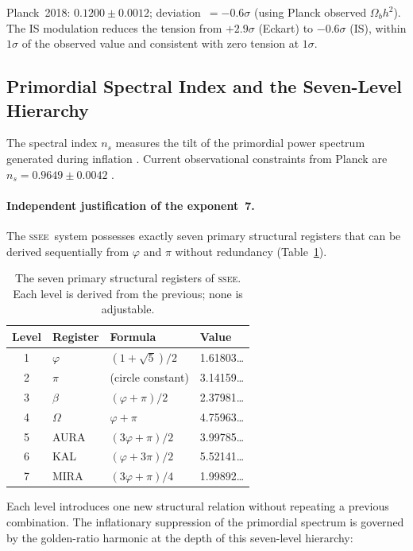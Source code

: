 \documentclass[12pt,a4paper]{article}
\newcommand{\SSEE}{\ifmmode\mathrm{SSEE}\else\textsc{ssee}\fi}
\begin{document}
Planck~2018: $0.1200\pm0.0012$; deviation~$= -0.6\sigma$ (using Planck observed $\Omega_b h^2$).
The IS modulation reduces the tension from $+2.9\sigma$ (Eckart) to $-0.6\sigma$ (IS),
within $1\sigma$ of the observed value and consistent with zero tension at $1\sigma$.

\subsection{Primordial Spectral Index and the Seven-Level Hierarchy}
\label{sec:ns}

The spectral index $n_s$ measures the tilt of the primordial power spectrum
generated during inflation \citep{Mukhanov1992,Starobinsky1980,Albrecht1982,Guth1981,Linde1982}.
Current observational constraints from Planck are $n_s = 0.9649 \pm 0.0042$
\citep{PlanckInflation2018}.

\paragraph{Independent justification of the exponent~7.}
The \SSEE\ system possesses exactly seven primary structural registers that
can be derived sequentially from $\varphi$ and $\pi$ without redundancy
(Table~\ref{tab:hierarchy}).

\begin{table}[ht]
\centering
\caption{The seven primary structural registers of \SSEE.
Each level is derived from the previous; none is adjustable.}
\label{tab:hierarchy}
\begin{tabular}{clll}
\toprule
Level & Register & Formula & Value \\
\midrule
1 & $\varphi$ & $(1+\sqrt5)/2$ & 1.61803\ldots \\
2 & $\pi$     & (circle constant) & 3.14159\ldots \\
3 & $\beta$    & $(\varphi+\pi)/2$         & 2.37981\ldots \\
4 & $\Omega$   & $\varphi+\pi$             & 4.75963\ldots \\
5 & AURA      & $(3\varphi+\pi)/2$         & 3.99785\ldots \\
6 & KAL       & $(\varphi+3\pi)/2$         & 5.52141\ldots \\
7 & MIRA      & $(3\varphi+\pi)/4$         & 1.99892\ldots \\
\bottomrule
\end{tabular}
\end{table}

Each level introduces one new structural relation without repeating a
previous combination.
The inflationary suppression of the primordial spectrum is governed by
the golden-ratio harmonic at the depth of this seven-level hierarchy:
\end{document}
